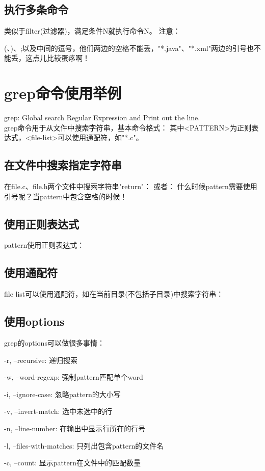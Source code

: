 ﻿\documentclass[a4paper,11pt]{article}
\begin{document}
  \subsection[执行多条命令]{执行多条命令}
  类似于filter(过滤器)，满足条件N就执行命令N。
  注意：\par
  \bs(、\bs)、\bs;以及中间的逗号，他们两边的空格不能丢，"*.java"、"*.xml"两边的引号也不能丢，这点儿比较蛋疼啊！


  \section[grep命令使用举例]{grep命令使用举例}
  grep: Global search Regular Expression and Print out the line.\\
  grep命令用于从文件中搜索字符串，基本命令格式：
  其中<PATTERN>为正则表达式，<file-list>可以使用通配符，如"*.c"。

  \subsection[在文件中搜索指定字符串]{在文件中搜索指定字符串}
  在file.c、file.h两个文件中搜索字符串"return"：
  或者：
  什么时候pattern需要使用引号呢？当pattern中包含空格的时候！

  \subsection[使用正则表达式]{使用正则表达式}
  pattern使用正则表达式：

  \subsection[使用通配符]{使用通配符}
  file list可以使用通配符，如在当前目录(不包括子目录)中搜索字符串：

  \subsection[使用options]{使用options}
  grep的options可以做很多事情：
  \begin{coloredenumerate}
    \item -r, --recursive: 递归搜索
    \item -w, --word-regexp: 强制pattern匹配单个word
    \item -i, --ignore-case: 忽略pattern的大小写
    \item -v, --invert-match: 选中未选中的行
    \item -n, --line-number: 在输出中显示行所在的行号
    \item -l, --files-with-matches: 只列出包含pattern的文件名
    \item -c, --count: 显示pattern在文件中的匹配数量
  \end{coloredenumerate}
\end{document}
